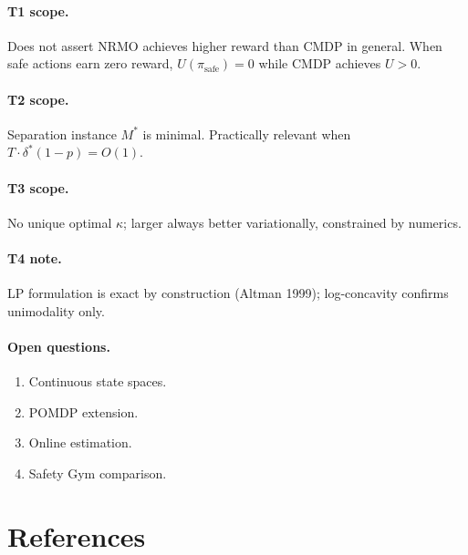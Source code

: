\paragraph{T1 scope.}
Does not assert NRMO achieves higher reward than CMDP in general.
When safe actions earn zero reward, $U(\pi_{\mathrm{safe}}) = 0$
while CMDP achieves $U > 0$.

\paragraph{T2 scope.}
Separation instance $M^*$ is minimal. Practically relevant when
$T \cdot \delta^* (1 - p) = O(1)$.

\paragraph{T3 scope.}
No unique optimal $\kappa$; larger always better variationally,
constrained by numerics.

\paragraph{T4 note.}
LP formulation is exact by construction (Altman 1999); log-concavity
confirms unimodality only.

\paragraph{Open questions.}

\begin{enumerate}
\item Continuous state spaces.
\item POMDP extension.
\item Online estimation.
\item Safety Gym comparison.
\end{enumerate}

\section{References}
\label{sec:tf-v4-references}

